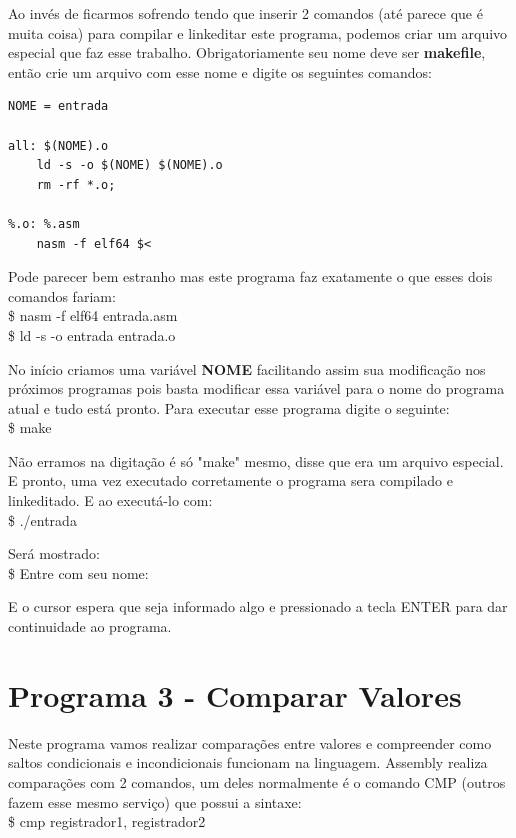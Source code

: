 Ao invés de ficarmos sofrendo tendo que inserir 2 comandos (até parece que é muita coisa) para compilar e linkeditar este programa, podemos criar um arquivo especial que faz esse trabalho. Obrigatoriamente seu nome deve ser \textbf{makefile}, então crie um arquivo com esse nome e digite os seguintes comandos:
\begin{lstlisting}[]
NOME = entrada

all: $(NOME).o
	ld -s -o $(NOME) $(NOME).o
	rm -rf *.o;

%.o: %.asm
	nasm -f elf64 $<
\end{lstlisting}

Pode parecer bem estranho mas este programa faz exatamente o que esses dois comandos fariam: \\
{\ttfamily\$ nasm -f elf64 entrada.asm} \\
{\ttfamily\$ ld -s -o entrada entrada.o}

No início criamos uma variável \textbf{NOME} facilitando assim sua modificação nos próximos programas pois basta modificar essa variável para o nome do programa atual e tudo está pronto. Para executar esse programa digite o seguinte: \\
{\ttfamily\$ make}

Não erramos na digitação é só "make" mesmo, disse que era um arquivo especial. E pronto, uma vez executado corretamente o programa sera compilado e linkeditado. E ao executá-lo com: \\
{\ttfamily\$ ./entrada}

Será mostrado: \\
{\ttfamily\$ Entre com seu nome:}

E o cursor espera que seja informado algo e pressionado a tecla ENTER para dar continuidade ao programa.

\section{Programa 3 - Comparar Valores}
Neste programa vamos realizar comparações entre valores e compreender como saltos condicionais e incondicionais funcionam na linguagem. Assembly realiza comparações com 2 comandos, um deles normalmente é o comando CMP (outros fazem esse mesmo serviço) que possui a sintaxe: \\
{\ttfamily\$ cmp registrador1, registrador2}

